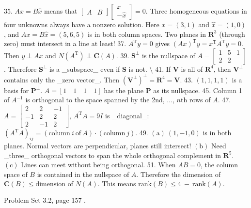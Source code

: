 35. \(Ax=B\widehat{x}\) means that \([\begin{array}{cc}A&B\end{array}]\left[\begin{array}{c}x\\ -\widehat{x}\end{array}\right]=0\). Three homogeneous equations in four unknowns always have a nonzero solution. Here \(x=(3,1)\) and \(\widehat{x}=(1,0)\), and \(Ax=B\widehat{x}=(5,6,5)\) is in both column spaces. Two planes in \(\mathbf{R}^{3}\) (through zero) must intersect in a line at least!
37. \(A^{\mathrm{T}}y=0\) gives \((Ax)^{\mathrm{T}}y=x^{\mathrm{T}}A^{\mathrm{T}}y=0\). Then \(y\perp Ax\) and \(N(A^{\mathrm{T}})\perp\boldsymbol{C}(A)\).
39. \(\mathbf{S}^{\perp}\) is the nullspace of \(A=\left[\begin{matrix}1&5&1\\ 2&2\end{matrix}\right]\). Therefore \(\mathbf{S}^{\perp}\) is a _subspace_ even if \(\mathbf{S}\) is not. \(\setminus\)
41. If \(\mathbf{V}\) is all of \(\mathbf{R}^{4}\), then \(\mathbf{V}^{\perp}\) contains only the _zero vector_. Then \((\mathbf{V}^{\perp})^{\perp}=\mathbf{R}^{4}=\mathbf{V}\).
43. \((1,1,1,1)\) is a basis for \(\mathbf{P}^{\perp}\). \(A=[1\quad 1\quad 1\quad 1]\) has the plane \(\mathbf{P}\) as its nullspace.
45. Column 1 of \(A^{-1}\) is orthogonal to the space spanned by the 2nd, ..., \(n\)th rows of \(A\).
47. \(A=\left[\begin{matrix}2&2&-1\\ -1&2&2\\ 2&-1&2\end{matrix}\right]\), \(A^{\mathrm{T}}A=9I\) is _diagonal_: \((A^{\mathrm{T}}A)_{ij}=(\mathrm{column}\ i\ \mathrm{of}\ A)\cdot(\mathrm{column}\ j)\).
49. \((\mathrm{a})\ (1,-1,0)\) is in both planes. Normal vectors are perpendicular, planes still intersect! \((\mathrm{b})\) Need _three_ orthogonal vectors to span the whole orthogonal complement in \(\mathbf{R}^{5}\). \((\mathrm{c})\) Lines can meet without being orthogonal.
51. When \(AB=0\), the column space of \(B\) is contained in the nullspace of \(A\). Therefore the dimension of \(\boldsymbol{C}(B)\leq\mathrm{dimension}\) of \(N(A)\). This means \(\mathrm{rank}(B)\leq 4\ -\ \mathrm{rank}(A)\).

Problem Set 3.2, page 157 .


